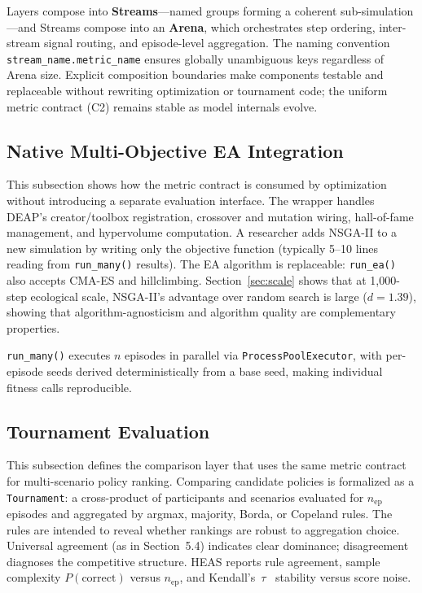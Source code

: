 \documentclass{wscpaperproc}
\begin{document}
Layers compose into \textbf{Streams}---named groups forming a coherent
sub-simulation---and Streams compose into an \textbf{Arena}, which orchestrates
step ordering, inter-stream signal routing, and episode-level aggregation. The
naming convention \texttt{stream\_name.metric\_name} ensures globally unambiguous
keys regardless of Arena size. Explicit composition boundaries make components
testable and replaceable without rewriting optimization or tournament code;
the uniform metric contract (C2) remains stable as model internals evolve.

\subsection{Native Multi-Objective EA Integration}

This subsection shows how the metric contract is consumed by optimization
without introducing a separate evaluation interface. The wrapper handles DEAP's creator/toolbox registration, crossover and mutation
wiring, hall-of-fame management, and hypervolume computation. A researcher adds
NSGA-II to a new simulation by writing only the objective function (typically
5--10 lines reading from \texttt{run\_many()} results). The EA algorithm is
replaceable: \texttt{run\_ea()} also accepts CMA-ES and hillclimbing.
Section~\ref{sec:scale} shows that at 1,000-step ecological scale, NSGA-II's
advantage over random search is large ($d\!=\!1.39$), showing that
algorithm-agnosticism and algorithm quality are complementary properties.

\texttt{run\_many()} executes $n$ episodes in parallel via
\texttt{ProcessPoolExecutor}, with per-episode seeds derived deterministically
from a base seed, making individual fitness calls reproducible.

\subsection{Tournament Evaluation}

This subsection defines the comparison layer that uses the same metric contract
for multi-scenario policy ranking. Comparing candidate policies is formalized as a \texttt{Tournament}: a
cross-product of participants and scenarios evaluated for $n_\text{ep}$
episodes and aggregated by argmax, majority, Borda, or Copeland rules. The
rules are intended to reveal whether rankings are robust to aggregation choice.
Universal agreement (as in Section~5.4) indicates clear dominance;
disagreement diagnoses the competitive structure.
HEAS reports rule agreement, sample complexity $P(\text{correct})$ versus
$n_\text{ep}$, and Kendall's~$\tau$~\cite{kendall1938new} stability versus
score noise.
\end{document}
